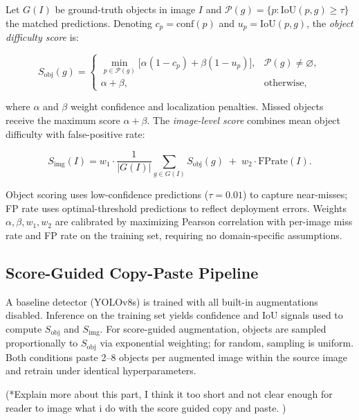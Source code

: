\documentclass[conference]{IEEEtran}
\begin{document}
Let $G(I)$ be ground-truth objects in image $I$ and
$\mathcal{P}(g) = \{p : \mathrm{IoU}(p,g) \ge \tau\}$
the matched predictions. Denoting $c_p = \mathrm{conf}(p)$
and $u_p = \mathrm{IoU}(p,g)$, the \emph{object difficulty score} is:

\begin{equation}
S_{\mathrm{obj}}(g) =
\begin{cases}
  \min_{p \in \mathcal{P}(g)}
    \bigl[\alpha(1{-}c_p) + \beta(1{-}u_p)\bigr],
    & \mathcal{P}(g) \neq \varnothing, \\[3pt]
  \alpha + \beta, & \text{otherwise,}
\end{cases}
\label{eq:obj}
\end{equation}

where $\alpha$ and $\beta$ weight confidence and localization penalties.
Missed objects receive the maximum score $\alpha{+}\beta$. The
\emph{image-level score} combines mean object difficulty with
false-positive rate:

\begin{equation}
S_{\mathrm{img}}(I)
  = w_1 \cdot \frac{1}{|G(I)|}\sum_{g\in G(I)} S_{\mathrm{obj}}(g)
  \;+\; w_2 \cdot \mathrm{FPrate}(I).
\label{eq:img}
\end{equation}

Object scoring uses low-confidence predictions ($\tau{=}0.01$) to
capture near-misses; FP rate uses optimal-threshold predictions to
reflect deployment errors. Weights $\alpha, \beta, w_1, w_2$ are
calibrated by maximizing Pearson correlation with per-image miss rate
and FP rate on the training set, requiring no domain-specific
assumptions.

\subsection{Score-Guided Copy-Paste Pipeline}

A baseline detector (YOLOv8s) is trained with all built-in augmentations
disabled. Inference on the training set yields confidence and IoU signals
used to compute $S_{\mathrm{obj}}$ and $S_{\mathrm{img}}$. For
score-guided augmentation, objects are sampled proportionally to
$S_{\mathrm{obj}}$ via exponential weighting; for random, sampling is
uniform. Both conditions paste 2--8 objects per augmented image within
the source image and retrain under identical hyperparameters.

(*Explain more about this part,
I think it too short and not clear enough for reader to image what i do 
with the score guided copy and paste.
)
\end{document}
